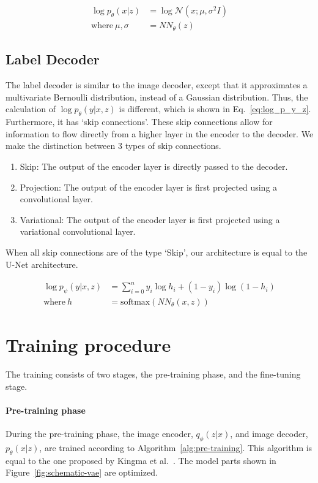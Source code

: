 \begin{equation}
    \begin{split}
        \log p_\theta(x|z)      & = \log \mathcal{N}(x; \mu, \sigma^2I) \label{eq:log_p_x_z} \\
        \text{where}~\mu,\sigma & =NN_\theta(z)
    \end{split}
\end{equation}

\subsection{Label Decoder}
The label decoder is similar to the image decoder, except that it approximates a multivariate Bernoulli distribution, instead of a Gaussian distribution. Thus, the calculation of $\log p_\theta(y|x,z)$ is different, which is shown in Eq.~\ref{eq:log_p_y_z}. Furthermore, it has `skip connections'. These skip connections allow for information to flow directly from a higher layer in the encoder to the decoder. We make the distinction between 3 types of skip connections.
\begin{enumerate}
    \item Skip: The output of the encoder layer is directly passed to the decoder.
    \item Projection: The output of the encoder layer is first projected using a convolutional layer.
    \item Variational: The output of the encoder layer is first projected using a variational convolutional layer.
\end{enumerate}
When all skip connections are of the type `Skip', our architecture is equal to the U-Net architecture.

\begin{subequations}
    \begin{align}
        \log p_\psi(y|x, z) & = \sum_{i=0}^n y_i \log h_i + (1 - y_i)\log(1-h_i) \label{eq:log_p_y_z} \\
        \text{where}~h      & = \text{softmax}(NN_\theta(x, z))
    \end{align}
\end{subequations}

\section{Training procedure}
The training consists of two stages, the pre-training phase, and the fine-tuning stage. 
\paragraph*{Pre-training phase} During the pre-training phase, the image encoder, $q_\phi(z|x)$, and image decoder, $p_\theta(x|z)$, are trained according to Algorithm~\ref{alg:pre-training}. This algorithm is equal to the one proposed by Kingma et al.~\cite{kingma2014autoencodingvariationalbayes}. The model parts shown in Figure~\ref{fig:schematic-vae} are optimized.

